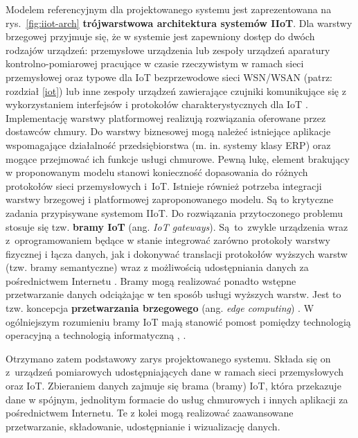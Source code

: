 \documentclass[a4paper, 12pt, twoside]{article}
\begin{document}
Modelem referencyjnym dla projektowanego systemu jest zaprezentowana na rys.~\ref{fig:iiot-arch}
\textbf{trójwarstwowa architektura systemów IIoT}. Dla warstwy brzegowej przyjmuje
się, że w systemie jest zapewniony dostęp do dwóch rodzajów urządzeń: przemysłowe urządzenia
lub zespoły urządzeń aparatury kontrolno-pomiarowej pracujące w czasie rzeczywistym
w ramach sieci przemysłowej
oraz typowe dla IoT bezprzewodowe sieci WSN/WSAN (patrz: rozdział \ref{iot})
lub inne zespoły urządzeń zawierające czujniki komunikujące się z wykorzystaniem
interfejsów i protokołów charakterystycznych dla IoT \cite{iiot-gateway-introduction}. Implementację warstwy
platformowej realizują rozwiązania oferowane przez dostawców chmury.
Do warstwy biznesowej mogą należeć istniejące aplikacje
wspomagające działalność przedsiębiorstwa
(m. in. systemy klasy ERP) oraz mogące przejmować ich funkcje usługi chmurowe.
Pewną lukę, element brakujący w proponowanym modelu stanowi konieczność dopasowania
do różnych protokołów sieci przemysłowych i~IoT. Istnieje również potrzeba integracji
warstwy brzegowej i platformowej zaproponowanego modelu. Są to krytyczne zadania
przypisywane systemom IIoT. Do rozwiązania
przytoczonego problemu stosuje się tzw. \textbf{bramy IoT} (ang. \emph{IoT gateways}). Są~to~zwykle
urządzenia wraz z~oprogramowaniem będące w stanie integrować zarówno protokoły
warstwy fizycznej i łącza danych, jak i dokonywać translacji protokołów wyższych warstw
(tzw. bramy semantyczne) wraz z możliwością udostępniania danych za pośrednictwem
Internetu \cite{iiot-heterogenous-gateways}. Bramy mogą realizować ponadto
wstępne przetwarzanie danych odciążając w ten sposób usługi wyższych warstw.
Jest to tzw. koncepcja \textbf{przetwarzania brzegowego} (ang. \emph{edge computing}) \cite{iot-gateway-medical-and-industrial}.
W ogólniejszym rozumieniu bramy IoT mają stanowić pomost pomiędzy technologią operacyjną a
technologią informatyczną \cite{iiot-gateway-introduction}, \cite{iiot-challenges-opportunities-directions}.

Otrzymano zatem podstawowy zarys projektowanego systemu.
Składa się on z~urządzeń pomiarowych udostępniających dane w ramach sieci
przemysłowych oraz IoT. Zbieraniem danych zajmuje się brama (bramy) IoT, która
przekazuje dane w spójnym, jednolitym
formacie do usług chmurowych i innych aplikacji za pośrednictwem Internetu.
Te z kolei mogą realizować zaawansowane przetwarzanie, składowanie, udostępnianie
i wizualizację danych.
\end{document}
